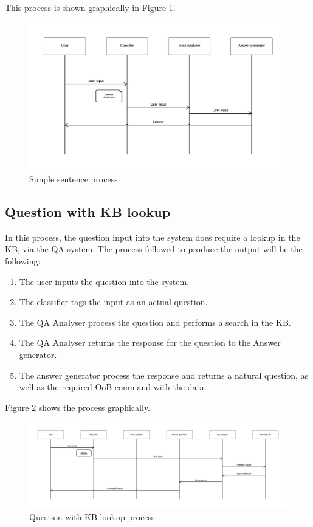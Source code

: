 This process is shown graphically in Figure \ref{fig:arch2}.

\begin{figure}[!htbp]
    \centering
    \includegraphics[width=\textwidth]{img/arch/SimpleSentence.png}
    \caption{Simple sentence process}
    \label{fig:arch2}
\end{figure}

\subsection{Question with \ac{KB} lookup}

In this process, the question input into the system does require a lookup in the \ac{KB}, via the \ac{QA} system. The process followed to produce the output will be the following:

\begin{enumerate}
 \item The user inputs the question into the system.
 \item The classifier tags the input as an actual question.
 \item The QA Analyser process the question and performs a search in the \ac{KB}.
 \item The QA Analyser returns the response for the question to the Answer generator.
 \item The answer generator process the response and returns a natural question, as well as the required \ac{OoB} command with the data.
\end{enumerate}

Figure \ref{fig:arch3} shows the process graphically.

\begin{figure}[!htbp]
    \centering
    \includegraphics[width=\textwidth]{img/arch/FullQuestion.png}
    \caption{Question with \ac{KB} lookup process}
    \label{fig:arch3}
\end{figure}

% 
